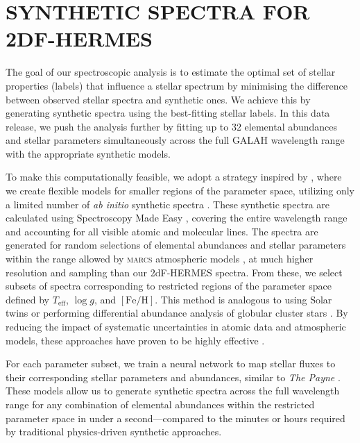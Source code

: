\documentclass[
  journal=pasa,
  manuscript=research-paper, %
  year=2024,
  volume=37
]{cup-journal}
\newcommand{\Teff}{$T_\mathrm{eff}$\xspace}
\newcommand{\logg}{$\log g$\xspace}
\newcommand{\feh}{$\mathrm{[Fe/H]}$\xspace}
\newcommand{\sme}{\textsc{sme}\xspace}
\newcommand{\marcs}{\textsc{marcs}\xspace}
\begin{document}
\section{SYNTHETIC SPECTRA FOR 2DF-HERMES}
\label{sec:synthetic_spectra}

The goal of our spectroscopic analysis is to estimate the optimal set of stellar properties (labels) that influence a stellar spectrum by minimising the difference between observed stellar spectra and synthetic ones. We achieve this by generating synthetic spectra using the best-fitting stellar labels. In this data release, we push the analysis further by fitting up to 32 elemental abundances and stellar parameters simultaneously across the full GALAH wavelength range with the appropriate synthetic models.

To make this computationally feasible, we adopt a strategy inspired by \citet{Rix2016}, where we create flexible models for smaller regions of the parameter space, utilizing only a limited number of \textit{ab initio} synthetic spectra \citep[see also][]{Ting2016b}. These synthetic spectra are calculated using Spectroscopy Made Easy \citep[\sme;][]{Valenti1996,Piskunov2017}, covering the entire wavelength range and accounting for all visible atomic and molecular lines. The spectra are generated for random selections of elemental abundances and stellar parameters within the range allowed by \marcs atmospheric models \citep{Gustafsson2008}, at much higher resolution and sampling than our 2dF-HERMES spectra. From these, we select subsets of spectra corresponding to restricted regions of the parameter space defined by \Teff, \logg, and \feh. This method is analogous to using Solar twins \citep[see, e.g.,][]{Nissen2015} or performing differential abundance analysis of globular cluster stars \citep[e.g.,][]{Yong2013, Monty2023}. By reducing the impact of systematic uncertainties in atomic data and atmospheric models, these approaches have proven to be highly effective \citep{Nissen2018}.

For each parameter subset, we train a neural network to map stellar fluxes to their corresponding stellar parameters and abundances, similar to \textit{The Payne} \citep{Ting2019}. These models allow us to generate synthetic spectra across the full wavelength range for any combination of elemental abundances within the restricted parameter space in under a second—compared to the minutes or hours required by traditional physics-driven synthetic approaches.
\end{document}

